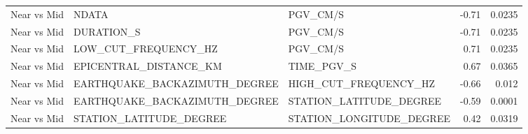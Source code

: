 \begin{table}[H]
\begin{tabular}{lllrr}
Near vs Mid & NDATA & PGV_CM/S & -0.71 & 0.0235 \\
Near vs Mid & DURATION_S & PGV_CM/S & -0.71 & 0.0235 \\
Near vs Mid & LOW_CUT_FREQUENCY_HZ & PGV_CM/S & 0.71 & 0.0235 \\
Near vs Mid & EPICENTRAL_DISTANCE_KM & TIME_PGV_S & 0.67 & 0.0365 \\
Near vs Mid & EARTHQUAKE_BACKAZIMUTH_DEGREE & HIGH_CUT_FREQUENCY_HZ & -0.66 & 0.012 \\
Near vs Mid & EARTHQUAKE_BACKAZIMUTH_DEGREE & STATION_LATITUDE_DEGREE & -0.59 & 0.0001 \\
Near vs Mid & STATION_LATITUDE_DEGREE & STATION_LONGITUDE_DEGREE & 0.42 & 0.0319 \\
\bottomrule
\end{tabular}
\end{table}